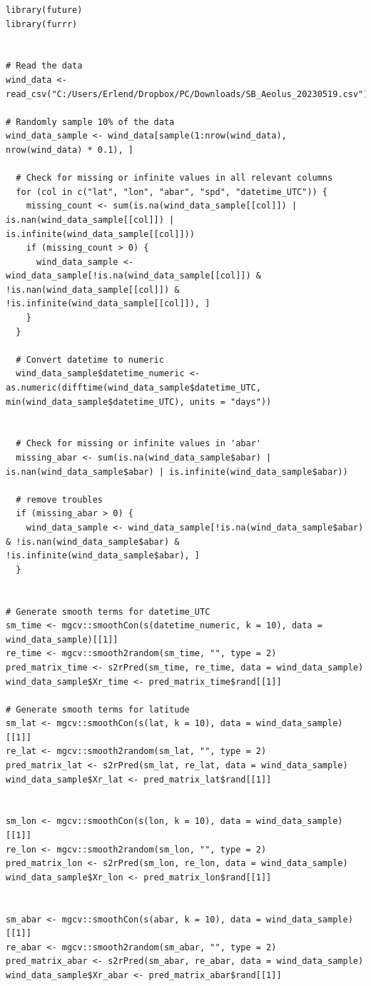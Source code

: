 \begin{verbatim}
library(future)
library(furrr)


# Read the data
wind_data <- read_csv("C:/Users/Erlend/Dropbox/PC/Downloads/SB_Aeolus_20230519.csv")
  
# Randomly sample 10% of the data
wind_data_sample <- wind_data[sample(1:nrow(wind_data), nrow(wind_data) * 0.1), ]
  
  # Check for missing or infinite values in all relevant columns
  for (col in c("lat", "lon", "abar", "spd", "datetime_UTC")) {
    missing_count <- sum(is.na(wind_data_sample[[col]]) | is.nan(wind_data_sample[[col]]) | is.infinite(wind_data_sample[[col]]))
    if (missing_count > 0) {
      wind_data_sample <- wind_data_sample[!is.na(wind_data_sample[[col]]) & !is.nan(wind_data_sample[[col]]) & !is.infinite(wind_data_sample[[col]]), ]
    }
  }
  
  # Convert datetime to numeric
  wind_data_sample$datetime_numeric <- as.numeric(difftime(wind_data_sample$datetime_UTC, min(wind_data_sample$datetime_UTC), units = "days"))
  
  
  # Check for missing or infinite values in 'abar'
  missing_abar <- sum(is.na(wind_data_sample$abar) | is.nan(wind_data_sample$abar) | is.infinite(wind_data_sample$abar))
  
  # remove troubles
  if (missing_abar > 0) {
    wind_data_sample <- wind_data_sample[!is.na(wind_data_sample$abar) & !is.nan(wind_data_sample$abar) & !is.infinite(wind_data_sample$abar), ]
  }
  

# Generate smooth terms for datetime_UTC
sm_time <- mgcv::smoothCon(s(datetime_numeric, k = 10), data = wind_data_sample)[[1]]
re_time <- mgcv::smooth2random(sm_time, "", type = 2)
pred_matrix_time <- s2rPred(sm_time, re_time, data = wind_data_sample)
wind_data_sample$Xr_time <- pred_matrix_time$rand[[1]]

# Generate smooth terms for latitude
sm_lat <- mgcv::smoothCon(s(lat, k = 10), data = wind_data_sample)[[1]]
re_lat <- mgcv::smooth2random(sm_lat, "", type = 2)
pred_matrix_lat <- s2rPred(sm_lat, re_lat, data = wind_data_sample)
wind_data_sample$Xr_lat <- pred_matrix_lat$rand[[1]]


sm_lon <- mgcv::smoothCon(s(lon, k = 10), data = wind_data_sample)[[1]]
re_lon <- mgcv::smooth2random(sm_lon, "", type = 2)
pred_matrix_lon <- s2rPred(sm_lon, re_lon, data = wind_data_sample)
wind_data_sample$Xr_lon <- pred_matrix_lon$rand[[1]]


sm_abar <- mgcv::smoothCon(s(abar, k = 10), data = wind_data_sample)[[1]]
re_abar <- mgcv::smooth2random(sm_abar, "", type = 2)
pred_matrix_abar <- s2rPred(sm_abar, re_abar, data = wind_data_sample)
wind_data_sample$Xr_abar <- pred_matrix_abar$rand[[1]]



\end{verbatim}
